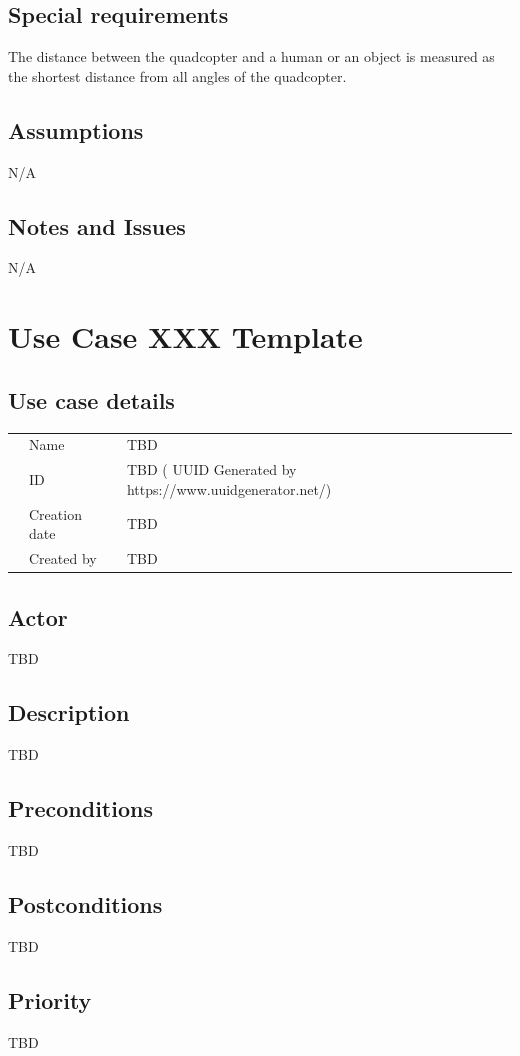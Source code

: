 \documentclass[a4paper]{article}
\begin{document}
\subsection{Special requirements}
The distance between the quadcopter and a human or an object is measured as the shortest distance from all angles of the quadcopter.
\subsection{Assumptions}
N/A
\subsection{Notes and Issues}
N/A

\section{Use Case XXX Template}
\subsection{Use case details}

\begin{tabular}{lll}
	&Name  & TBD \\
	&ID  & TBD ( UUID Generated by https://www.uuidgenerator.net/) \\
	&Creation date  & TBD \\
	&Created by  & TBD 
\end{tabular}

\subsection{Actor}
TBD
\subsection{Description}
TBD
\subsection{Preconditions}
TBD
\subsection{Postconditions}
TBD
\subsection{Priority}
TBD
\end{document}
